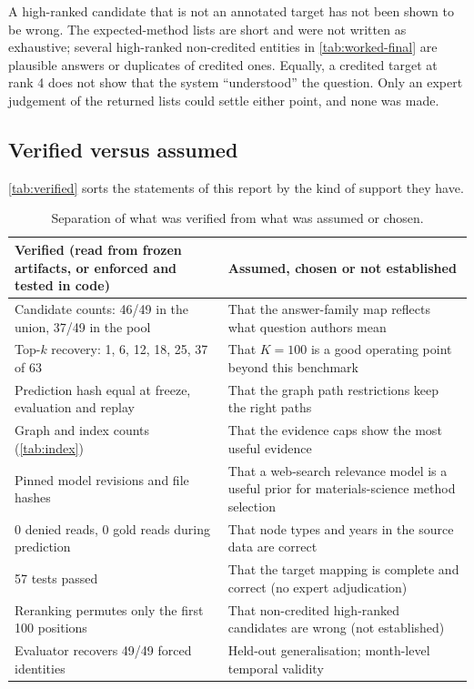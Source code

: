 \documentclass[11pt,a4paper]{article}
\newcommand{\cref}[1]{\autoref{#1}}
\newcommand{\Cref}[1]{\autoref{#1}}
\theoremstyle{remark}
\begin{document}
\begin{cautionbox}
A high-ranked candidate that is not an annotated target has not been shown to be wrong.
The expected-method lists are short and were not written as exhaustive; several
high-ranked non-credited entities in \cref{tab:worked-final} are plausible answers or
duplicates of credited ones. Equally, a credited target at rank 4 does not show that the
system ``understood'' the question. Only an expert judgement of the returned lists could
settle either point, and none was made.
\end{cautionbox}

\subsection{Verified versus assumed}

\Cref{tab:verified} sorts the statements of this report by the kind of support they have.

\begin{table}[H]
\centering
\caption[Verified versus assumed]{Separation of what was verified from what was assumed or chosen.}
\label{tab:verified}
\small
\begin{tabularx}{\linewidth}{XX}
\toprule
Verified (read from frozen artifacts, or enforced and tested in code) & Assumed, chosen or not established\\
\midrule
Candidate counts: 46/49 in the union, 37/49 in the pool & That the answer-family map reflects what question authors mean\\
Top-$k$ recovery: 1, 6, 12, 18, 25, 37 of 63 & That $K=100$ is a good operating point beyond this benchmark\\
Prediction hash equal at freeze, evaluation and replay & That the graph path restrictions keep the right paths\\
Graph and index counts (\cref{tab:index}) & That the evidence caps show the most useful evidence\\
Pinned model revisions and file hashes & That a web-search relevance model is a useful prior for materials-science method selection\\
0 denied reads, 0 gold reads during prediction & That node types and years in the source data are correct\\
57 tests passed & That the target mapping is complete and correct (no expert adjudication)\\
Reranking permutes only the first 100 positions & That non-credited high-ranked candidates are wrong (not established)\\
Evaluator recovers 49/49 forced identities & Held-out generalisation; month-level temporal validity\\
\bottomrule
\end{tabularx}
\end{table}
\end{document}
